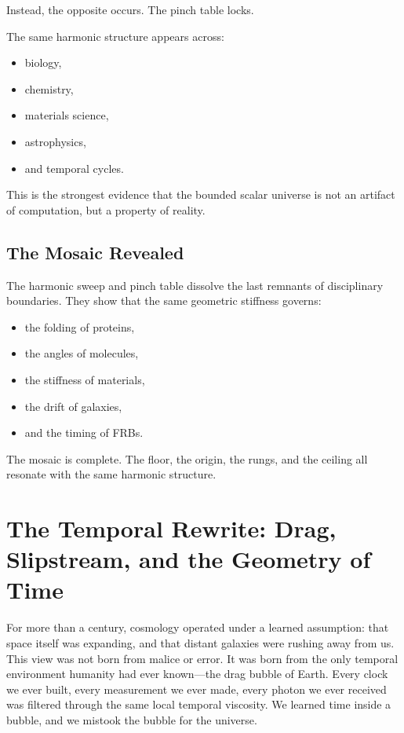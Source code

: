 \documentclass[11pt, letterpaper, openany]{book}
\begin{document}
Instead, the opposite occurs.  
The pinch table locks.

The same harmonic structure appears across:

\begin{itemize}
    \item biology,
    \item chemistry,
    \item materials science,
    \item astrophysics,
    \item and temporal cycles.
\end{itemize}

This is the strongest evidence that the bounded scalar universe is not an artifact of computation, but
a property of reality.

\section*{The Mosaic Revealed}
The harmonic sweep and pinch table dissolve the last remnants of disciplinary boundaries. They
show that the same geometric stiffness governs:

\begin{itemize}
    \item the folding of proteins,
    \item the angles of molecules,
    \item the stiffness of materials,
    \item the drift of galaxies,
    \item and the timing of FRBs.
\end{itemize}

The mosaic is complete.  
The floor, the origin, the rungs, and the ceiling all resonate with the same harmonic structure.

\chapter{The Temporal Rewrite: Drag, Slipstream, and the Geometry of Time}

For more than a century, cosmology operated under a learned assumption: that space itself was
expanding, and that distant galaxies were rushing away from us. This view was not born from
malice or error. It was born from the only temporal environment humanity had ever known—the
drag bubble of Earth. Every clock we ever built, every measurement we ever made, every photon we
ever received was filtered through the same local temporal viscosity. We learned time inside a
bubble, and we mistook the bubble for the universe.
\end{document}
